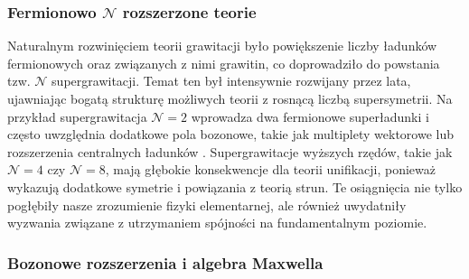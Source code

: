 \documentclass[12pt,a4paper]{article}
\begin{document}
\subsubsection{Fermionowo $\mathcal{N}$ rozszerzone teorie}

Naturalnym rozwinięciem teorii grawitacji było powiększenie liczby ładunków fermionowych oraz związanych z nimi grawitin, co doprowadziło do powstania tzw. $\mathcal{N}$ supergrawitacji. Temat ten był intensywnie rozwijany przez lata, ujawniając bogatą strukturę możliwych teorii z rosnącą liczbą supersymetrii. Na przykład supergrawitacja $\mathcal{N}=2$ \cite{Gocanin:2019ota} wprowadza dwa fermionowe superładunki i często uwzględnia dodatkowe pola bozonowe, takie jak multiplety wektorowe lub rozszerzenia centralnych ładunków \cite{Haag:1974qh}. Supergrawitacje wyższych rzędów, takie jak $\mathcal{N}=4$ czy $\mathcal{N}=8$, mają głębokie konsekwencje dla teorii unifikacji, ponieważ wykazują dodatkowe symetrie i powiązania z teorią strun. Te osiągnięcia nie tylko pogłębiły nasze zrozumienie fizyki elementarnej, ale również uwydatniły wyzwania związane z utrzymaniem spójności na fundamentalnym poziomie.

\subsubsection{Bozonowe rozszerzenia i algebra Maxwella}
\end{document}
